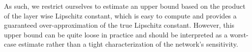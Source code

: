 As such, we restrict ourselves to estimate an upper bound based on the product of the layer wise Lipschitz constant, which is easy to compute and provides a guaranteed over-approximation of the true Lipschitz constant. 
However, this upper bound can be quite loose in practice and should be interpreted as a worst-case estimate rather than a tight characterization of the network's sensitivity. 


